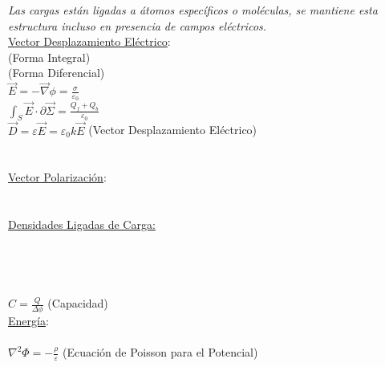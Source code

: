 \documentclass[10pt,landscape]{article}
\begin{document}
\begin{multicols}{3}
    \textit{Las cargas están ligadas a átomos específicos o moléculas, se mantiene esta estructura incluso en presencia de campos eléctricos.}\\
    \underline{Vector Desplazamiento Eléctrico}:\\
         (Forma Integral)\\
         (Forma Diferencial)\\
    $ \vec{E} = -\vec{\nabla} \phi = \frac{\sigma}{\varepsilon_0} $\\
    $\int_S \vec{E} \cdot \partial \vec{\Sigma} = \frac{Q_f + Q_b}{\varepsilon_0}$ \\
    $\vec{D} = \varepsilon \vec{E} = \varepsilon_0 k \vec{E}$ (Vector Desplazamiento Eléctrico) \\
        \\
         \\
    \underline{Vector Polarización}:\\
        \\
         \\
    \underline{Densidades Ligadas de Carga:}\\
        \\
        \\
        \\
        \\
    $C = \frac{Q}{\Delta \phi}$ (Capacidad)\\
    \underline{Energía}: \\
        \\
    $\nabla^{2}\Phi = -\frac{\rho}{\varepsilon}$ (Ecuación de Poisson para el Potencial) \\
		\\
	

\end{multicols}
\end{document}

